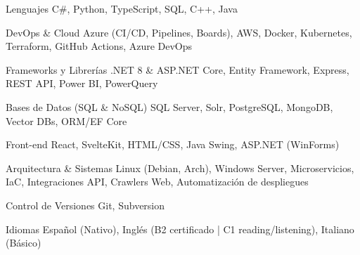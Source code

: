 
\begin{cvskills}
    \cvskill
    {Lenguajes}
    {C\#, Python, TypeScript, SQL, C++, Java}

    \cvskill
    {DevOps \& Cloud}
    {Azure (CI/CD, Pipelines, Boards), AWS, Docker, Kubernetes, Terraform, GitHub Actions, Azure DevOps}

    \cvskill
    {Frameworks y Librerías}
    {.NET 8 \& ASP.NET Core, Entity Framework, Express, REST API, Power BI, PowerQuery}

    \cvskill
    {Bases de Datos (SQL \& NoSQL)}
    {SQL Server, Solr, PostgreSQL, MongoDB, Vector DBs, ORM/EF Core}

    \cvskill
    {Front-end}
    {React, SvelteKit, HTML/CSS, Java Swing, ASP.NET (WinForms)}

    \cvskill
    {Arquitectura \& Sistemas}
    {Linux (Debian, Arch), Windows Server, Microservicios, IaC, Integraciones API,
     Crawlers Web, Automatización de despliegues}

    \cvskill
    {Control de Versiones}
    {Git, Subversion}

    \cvskill
    {Idiomas}
    {Español (Nativo), Inglés (B2 certificado | C1 reading/listening), Italiano (Básico)}
\end{cvskills}
